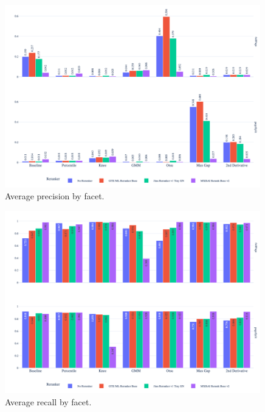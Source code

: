 \begin{figure}[htbp]
  \centering
  \includegraphics[width=0.99\textwidth]{reranker/avg_precision_bar_faceted.png}
  \caption{\footnotesize Average precision by facet.}
  \label{fig:avg_precision}
\end{figure}

\begin{figure}[htbp]
  \centering
  \includegraphics[width=0.99\textwidth]{reranker/avg_recall_bar_faceted.png}
  \caption{\footnotesize Average recall by facet.}
  \label{fig:avg_recall}
\end{figure}

